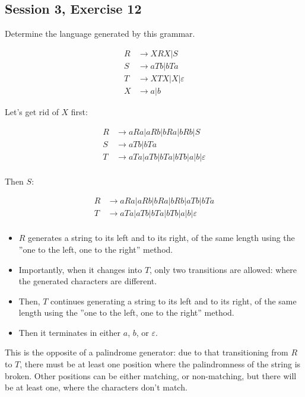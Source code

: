 \subsection{Session 3, Exercise 12}


Determine the language generated by this grammar.

\begin{align*}
R &\rightarrow XRX | S\\
S &\rightarrow aTb | bTa\\
T &\rightarrow XTX | X | \varepsilon\\
X &\rightarrow a | b
\end{align*}


Let's get rid of $X$ first:

\begin{align*}
R &\rightarrow aRa | aRb | bRa | bRb | S\\
S &\rightarrow aTb | bTa\\
T &\rightarrow aTa | aTb | bTa | bTb | a | b | \varepsilon\\
\end{align*}

Then $S$:

\begin{align*}
R &\rightarrow aRa | aRb | bRa | bRb | aTb | bTa \\
T &\rightarrow aTa | aTb | bTa | bTb | a | b | \varepsilon\\
\end{align*}

\begin{itemize}
    \item $R$ generates a string to its left and to its right, of the same length using the
''one to the left, one to the right'' method.
    \item Importantly, when it changes into $T$, only two transitions are allowed: where the generated characters are different.
    \item Then, $T$ continues generating a string to its left and to its right, of the same length using the ''one to the left, one to the right'' method.
    \item Then it terminates in either $a$, $b$, or $\varepsilon$.
\end{itemize}

This is the opposite of a palindrome generator: due to that transitioning from $R$ to $T$, there must be at least one position where the palindromness of the string is broken. Other positions can be either matching, or non-matching, but there will be at least one, where the characters don't match.


